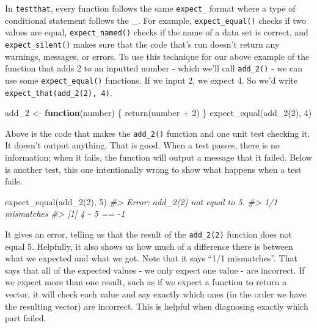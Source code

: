 \documentclass[
]{krantz}
\makeatletter
\newenvironment{Shaded}{\begin{snugshade}}{\end{snugshade}}
\newcommand{\CommentTok}[1]{\textcolor[rgb]{0.37,0.37,0.37}{\textit{#1}}}
\newcommand{\ControlFlowTok}[1]{\textcolor[rgb]{0.27,0.27,0.27}{\textbf{#1}}}
\newcommand{\DecValTok}[1]{\textcolor[rgb]{0.06,0.06,0.06}{#1}}
\newcommand{\FunctionTok}[1]{\textcolor[rgb]{0,0,0}{#1}}
\newcommand{\NormalTok}[1]{#1}
\newcommand{\OtherTok}[1]{\textcolor[rgb]{0.37,0.37,0.37}{#1}}
\newcommand{\SpecialCharTok}[1]{\textcolor[rgb]{0,0,0}{#1}}
\newenvironment{kframe}{%
\medskip{}
\setlength{\fboxsep}{.8em}
 \def\at@end@of@kframe{}%
 \ifinner\ifhmode%
  \def\at@end@of@kframe{\end{minipage}}%
  \begin{minipage}{\columnwidth}%
 \fi\fi%
 \def\FrameCommand##1{\hskip\@totalleftmargin \hskip-\fboxsep
 \colorbox{shadecolor}{##1}\hskip-\fboxsep
     \hskip-\linewidth \hskip-\@totalleftmargin \hskip\columnwidth}%
 \MakeFramed {\advance\hsize-\width
   \@totalleftmargin\z@ \linewidth\hsize
   \@setminipage}}%
 {\par\unskip\endMakeFramed%
 \at@end@of@kframe}
\renewenvironment{Shaded}{\begin{kframe}}{\end{kframe}}
\makeatother
\begin{document}
In \texttt{testthat}, every function follows the same \texttt{expect\_} format where a type of conditional statement follows the \_. For example, \texttt{expect\_equal()} checks if two values are equal, \texttt{expect\_named()} checks if the name of a data set is correct, and \texttt{expect\_silent()} makes sure that the code that's run doesn't return any warnings, messages, or errors. To use this technique for our above example of the function that adds 2 to an inputted number - which we'll call \texttt{add\_2()} - we can use some \texttt{expect\_equal()} functions. If we input 2, we expect 4. So we'd write \texttt{expect\_that(add\_2(2),\ 4)}.

\begin{Shaded}
\begin{Highlighting}[]
\NormalTok{add\_2 }\OtherTok{\textless{}{-}} \ControlFlowTok{function}\NormalTok{(number) \{ }\FunctionTok{return}\NormalTok{(number }\SpecialCharTok{+} \DecValTok{2}\NormalTok{) \}}
\FunctionTok{expect\_equal}\NormalTok{(}\FunctionTok{add\_2}\NormalTok{(}\DecValTok{2}\NormalTok{), }\DecValTok{4}\NormalTok{)}
\end{Highlighting}
\end{Shaded}

Above is the code that makes the \texttt{add\_2()} function and one unit test checking it. It doesn't output anything. That is good. When a test passes, there is no information; when it fails, the function will output a message that it failed. Below is another test, this one intentionally wrong to show what happens when a test fails.

\begin{Shaded}
\begin{Highlighting}[]
\FunctionTok{expect\_equal}\NormalTok{(}\FunctionTok{add\_2}\NormalTok{(}\DecValTok{2}\NormalTok{), }\DecValTok{5}\NormalTok{)}
\CommentTok{\#\textgreater{} Error: add\_2(2) not equal to 5.}
\CommentTok{\#\textgreater{} 1/1 mismatches}
\CommentTok{\#\textgreater{} [1] 4 {-} 5 == {-}1}
\end{Highlighting}
\end{Shaded}

It gives an error, telling us that the result of the \texttt{add\_2(2)} function does not equal 5. Helpfully, it also shows us how much of a difference there is between what we expected and what we got. Note that it says ``1/1 mismatches''. That says that all of the expected values - we only expect one value - are incorrect. If we expect more than one result, such as if we expect a function to return a vector, it will check each value and say exactly which ones (in the order we have the resulting vector) are incorrect. This is helpful when diagnosing exactly which part failed.
\end{document}
